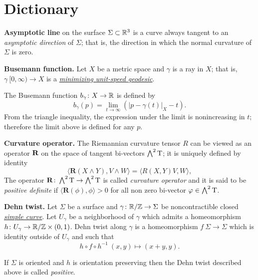 \chapter{Dictionary}

\begin{description}

\item{\bf Asymptotic line}\label{Asymptotic line} on the surface $\Sigma\subset \mathbb{R}^3$
is a curve always tangent to an \emph{asymptotic direction} of $\Sigma$; 
that is, the direction in which the normal curvature of $\Sigma$ is zero.

\item{\bf Busemann function.}\label{Busemann function} 
Let $X$ be a metric space
and $\gamma$ is a ray in $X$; 
that is, $\gamma\:[0, \infty)\to X$ is a \hyperref[Geodesic]{\emph{minimizing unit-speed geodesic}}.

The Busemann function $b_\gamma\colon X\to\mathbb{R}$ is defined by
$$b_\gamma(p)=\lim_{t\to\infty}\left(|p-\gamma(t)|_X-t\right).$$
From the triangle inequality, 
the expression under the limit is nonincreasing in $t$; 
therefore  the limit above is defined for any $p$.

\item{\bf Curvature operator.}\label{Curvature operator}
The Riemannian curvature tensor $R$
can be viewed as an operator $\text{\bf R}$ on the space of tangent bi-vectors $\bigwedge^2 \mathrm{T}$;
it is uniquely defined by identity
$$\langle\mathbf{R}(X\wedge Y),V\wedge W\rangle
=
\langle R(X,Y)V,W\rangle,$$
The operator $\mathbf{R}\colon\bigwedge^2 \mathrm{T}\to \bigwedge^2 \mathrm{T}$ is called \emph{curvature operator} and it is said to be \emph{positive definite} if
$\langle\mathbf{R}(\phi),\phi\rangle>0$ for all non zero
bi-vector $\varphi\in\bigwedge^2 \mathrm{T}$.

\item{\bf Dehn twist.}\label{Dehn twist}
Let $\Sigma$ be a surface and $\gamma\colon\mathbb{R}/\mathbb{Z}\to\Sigma$ be noncontractible closed \hyperref[Simple curve]{\emph{simple curve}}.
Let $U_\gamma$ be a neighborhood of $\gamma$ which admits a homeomorphism $h\colon U_\gamma\to \mathbb{R}/\mathbb{Z}\times (0,1)$.
Dehn twist along $\gamma$ is a homeomorphism $f\:\Sigma\to\Sigma$
which is identity outside of $U_\gamma$ and 
such that
$$h\circ f\circ h^{-1}\:(x,y)\mapsto(x+y,y).$$

If $\Sigma$ is oriented 
and $h$ is orientation preserving
then the Dehn twist described above is called \emph{positive}.


\end{description}
